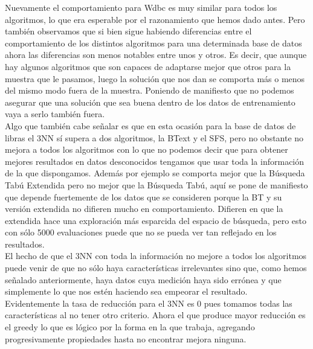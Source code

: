 \documentclass[10pt,a4paper]{article}
\begin{document}
Nuevamente el comportamiento para Wdbc es muy similar para todos los algoritmos, lo que era esperable por el razonamiento que hemos dado antes. Pero también observamos que si bien sigue habiendo diferencias entre el comportamiento de los distintos algoritmos para una determinada base de datos ahora las diferencias son menos notables entre unos y otros. Es decir, que aunque hay algunos algoritmos que son capaces de adaptarse mejor que otros para la muestra que le pasamos, luego la solución que nos dan se comporta más o menos del mismo modo fuera de la muestra. Poniendo de manifiesto que no podemos asegurar que una solución que sea buena dentro de los datos de entrenamiento vaya a serlo también fuera.\\

Algo que también cabe señalar es que en esta ocasión para la base de datos de libras el 3NN sí supera a dos algoritmos, la BText y el SFS, pero no obstante no mejora a todos los algoritmos con lo que no podemos decir que para obtener mejores resultados en datos desconocidos tengamos que usar toda la información de la que dispongamos. Además por ejemplo se comporta mejor que la Búsqueda Tabú Extendida pero no mejor que la Búsqueda Tabú, aquí se pone de manifiesto que depende fuertemente de los datos que se consideren porque la BT y su versión extendida no difieren mucho en comportamiento. Difieren en que la extendida hace una exploración más esparcida del espacio de búsqueda, pero esto con sólo 5000 evaluaciones puede que no se pueda ver tan reflejado en los resultados.\\

El hecho de que el 3NN con toda la información no mejore a todos los algoritmos puede venir de que no sólo haya características irrelevantes sino que, como hemos señalado anteriormente, haya datos cuya medición haya sido errónea y que simplemente lo que nos estén haciendo sea empeorar el resultado.\\


Evidentemente la tasa de reducción para el 3NN es 0 pues tomamos todas las características al no tener otro criterio. Ahora el que produce mayor reducción es el greedy lo que es lógico por la forma en la que trabaja, agregando progresivamente propiedades hasta no encontrar mejora ninguna.\\
\end{document}
